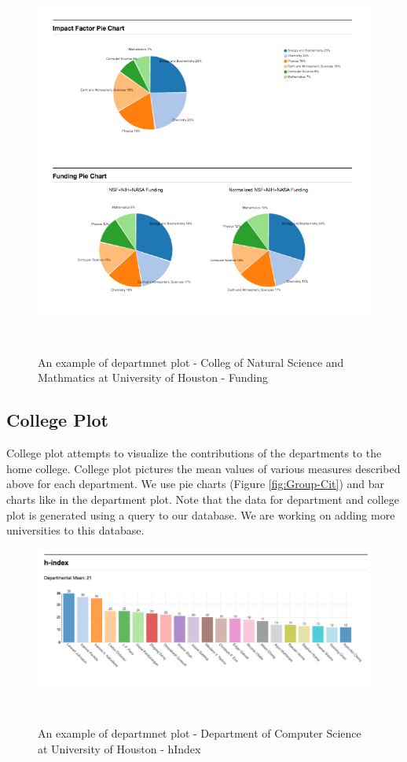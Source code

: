 \begin{figure}
  \centering
  \includegraphics[width=1\textwidth]{figures/Coll-Fund}
  \caption{An example of departmnet plot - Colleg of Natural Science and Mathmatics at University of Houston - Funding}~\label{fig:DP-College1}
\end{figure}



\subsection{College Plot}

College plot attempts to visualize the contributions of the departments to the home college. College plot pictures the mean values of various measures described above for each department. We use pie charts (Figure \ref{fig:Group-Cit}) and bar charts like in the department plot. Note that the data for department and college plot is generated using a query to our database. We are working on adding more universities to this database.


\begin{figure}
  \centering
  \includegraphics[width=1\textwidth]{figures/Dept-h}
  \caption{An example of departmnet plot - Department of Computer Science at University of Houston - hIndex}~\label{fig:DP-College1}
\end{figure}

